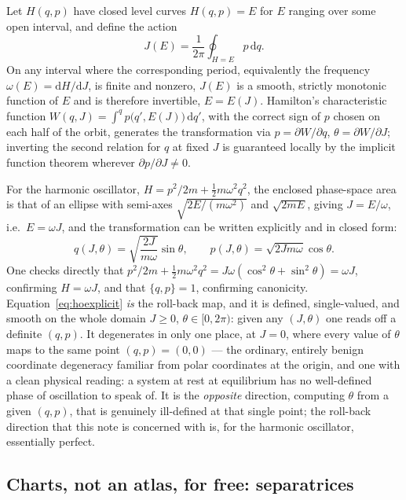 \documentclass[11pt]{article}
\newcommand{\dd}{\mathrm{d}}
\begin{document}
Let $H(q,p)$ have closed level curves $H(q,p)=E$ for $E$ ranging over some open interval, and define the action
\begin{equation}
J(E)=\frac{1}{2\pi}\oint_{H=E} p\,\dd q .
\label{eq:actiondef}
\end{equation}
On any interval where the corresponding period, equivalently the frequency $\omega(E)=\dd H/\dd J$, is finite and nonzero, $J(E)$ is a smooth, strictly monotonic function of $E$ and is therefore invertible, $E=E(J)$. Hamilton's characteristic function $W(q,J)=\int^q p\big(q',E(J)\big)\,\dd q'$, with the correct sign of $p$ chosen on each half of the orbit, generates the transformation via $p=\partial W/\partial q$, $\theta=\partial W/\partial J$; inverting the second relation for $q$ at fixed $J$ is guaranteed locally by the implicit function theorem wherever $\partial p/\partial J\neq0$.

For the harmonic oscillator, $H=p^2/2m+\tfrac12 m\omega^2q^2$, the enclosed phase-space area is that of an ellipse with semi-axes $\sqrt{2E/(m\omega^2)}$ and $\sqrt{2mE}$, giving $J=E/\omega$, i.e.\ $E=\omega J$, and the transformation can be written explicitly and in closed form:
\begin{equation}
q(J,\theta)=\sqrt{\frac{2J}{m\omega}}\sin\theta,\qquad p(J,\theta)=\sqrt{2Jm\omega}\cos\theta .
\label{eq:hoexplicit}
\end{equation}
One checks directly that $p^2/2m+\tfrac12m\omega^2q^2=J\omega(\cos^2\theta+\sin^2\theta)=\omega J$, confirming $H=\omega J$, and that $\{q,p\}=1$, confirming canonicity. Equation~\eqref{eq:hoexplicit} \emph{is} the roll-back map, and it is defined, single-valued, and smooth on the whole domain $J\ge0$, $\theta\in[0,2\pi)$: given any $(J,\theta)$ one reads off a definite $(q,p)$. It degenerates in only one place, at $J=0$, where every value of $\theta$ maps to the same point $(q,p)=(0,0)$ --- the ordinary, entirely benign coordinate degeneracy familiar from polar coordinates at the origin, and one with a clean physical reading: a system at rest at equilibrium has no well-defined phase of oscillation to speak of. It is the \emph{opposite} direction, computing $\theta$ from a given $(q,p)$, that is genuinely ill-defined at that single point; the roll-back direction that this note is concerned with is, for the harmonic oscillator, essentially perfect.

\subsection{Charts, not an atlas, for free: separatrices}
\end{document}
